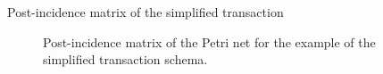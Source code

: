 \documentclass{beamer}
\begin{document}
\begin{frame}{Post-incidence matrix of the simplified transaction}
    \begin{figure}
        \vspace{.2cm}
        \caption{Post-incidence matrix of the Petri net for the example of the simplified transaction schema.}
        \label{Post-esempio1}
    \end{figure}
\end{frame}
\end{document}
